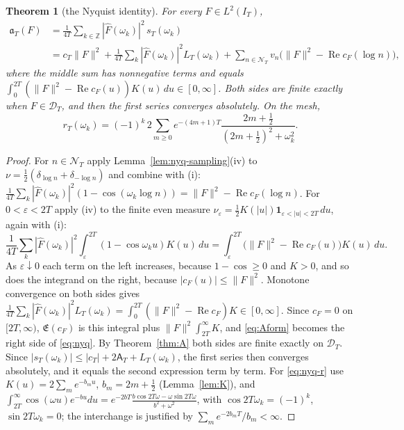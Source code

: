 \documentclass[11pt]{amsart}
\newtheorem{theorem}{Theorem}[section]
\theoremstyle{definition}
\theoremstyle{remark}
\newcommand{\Z}{\mathbb Z}
\newcommand{\Rel}{\operatorname{Re}}
\newcommand{\IT}{I_T}
\newcommand{\Fh}{\widehat F}
\newcommand{\cF}{c_F}
\newcommand{\Lev}{\mathfrak E}
\newcommand{\NT}{\mathcal N_T}
\newcommand{\Aconst}{\mathsf A_T}
\begin{document}
\begin{theorem}[the Nyquist identity]\label{thm:nyq}
For every $F\in L^2(\IT)$,
\begin{equation}\label{eq:nyq}
\begin{aligned}
\mathfrak a_T(F)&=\frac1{4T}\sum_{k\in\Z}|\Fh(\omega_k)|^2\,s_T(\omega_k)\\
&=c_T\|F\|^2+\frac1{4T}\sum_k|\Fh(\omega_k)|^2L_T(\omega_k)
+\sum_{n\in\NT}v_n\big(\|F\|^2-\Rel\cF(\log n)\big),
\end{aligned}
\end{equation}
where the middle sum has nonnegative terms and equals $\int_0^{2T}(\|F\|^2-\Rel\cF(u))K(u)\,du\in[0,\infty]$.
Both sides are finite exactly when $F\in\mathcal D_T$, and then the first series converges absolutely. On the
mesh,
\begin{equation}\label{eq:nyq-r}
r_T(\omega_k)=(-1)^k\,2\sum_{m\ge0}e^{-(4m+1)T}\frac{2m+\frac12}{(2m+\frac12)^2+\omega_k^2}.
\end{equation}
\end{theorem}

\begin{proof}
For $n\in\NT$ apply Lemma~\ref{lem:nyq-sampling}(iv) to $\nu=\frac12(\delta_{\log n}+\delta_{-\log n})$ and
combine with (i): $\frac1{4T}\sum_k|\Fh(\omega_k)|^2(1-\cos(\omega_k\log n))=\|F\|^2-\Rel\cF(\log n)$. For
$0<\varepsilon<2T$ apply (iv) to the finite even measure $\nu_\varepsilon=\frac12K(|u|)\mathbf 1_{\varepsilon<|u|<2T}\,du$,
again with (i):
\[
\frac1{4T}\sum_k|\Fh(\omega_k)|^2\int_\varepsilon^{2T}(1-\cos\omega_ku)K(u)\,du
=\int_\varepsilon^{2T}\big(\|F\|^2-\Rel\cF(u)\big)K(u)\,du .
\]
As $\varepsilon\downarrow0$ each term on the left increases, because $1-\cos\ge0$ and $K>0$, and so does the
integrand on the right, because $|\cF(u)|\le\|F\|^2$. Monotone convergence on both sides gives
$\frac1{4T}\sum_k|\Fh(\omega_k)|^2L_T(\omega_k)=\int_0^{2T}(\|F\|^2-\Rel\cF)K\in[0,\infty]$. Since $\cF=0$ on
$[2T,\infty)$, $\Lev(\cF)$ is this integral plus $\|F\|^2\int_{2T}^\infty K$, and \eqref{eq:Aform} becomes the
right side of \eqref{eq:nyq}. By Theorem~\ref{thm:A} both sides are finite exactly on $\mathcal D_T$. Since
$|s_T(\omega_k)|\le|c_T|+2\Aconst+L_T(\omega_k)$, the first series then converges absolutely, and it equals the
second expression term by term. For \eqref{eq:nyq-r} use $K(u)=2\sum_me^{-b_mu}$, $b_m=2m+\frac12$
(Lemma~\ref{lem:K}), and $\int_{2T}^\infty\cos(\omega u)e^{-bu}du=e^{-2bT}\frac{b\cos2T\omega-\omega\sin2T\omega}{b^2+\omega^2}$,
with $\cos2T\omega_k=(-1)^k$, $\sin2T\omega_k=0$; the interchange is justified by $\sum_m e^{-2b_mT}/b_m<\infty$.
\end{proof}
\end{document}
